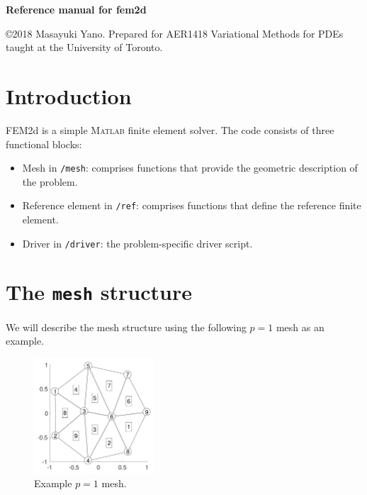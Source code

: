 \documentclass[openany,preprint,11pt]{article}
\newcommand{\disclaimer}{\copyright2018 Masayuki Yano.  Prepared for AER1418 Variational Methods for PDEs taught at the University of Toronto.}
\begin{document}
\begin{center}
  \begin{LARGE}
    \textbf{Reference manual for fem2d}
  \end{LARGE}
\end{center}

\noindent\disclaimer
\section{Introduction}
FEM2d is a simple \textsc{Matlab} finite element solver.  The code consists of three functional blocks:
\begin{itemize}
\item Mesh in \texttt{/mesh}: comprises functions that provide the geometric description of the problem. 
\item Reference element in \texttt{/ref}: comprises functions that define the reference finite element.
\item Driver in \texttt{/driver}: the problem-specific driver script.
\end{itemize}
\section{The \texttt{mesh} structure}
We will describe the mesh structure using the following $p=1$ mesh as an example.
\begin{figure}[!h]
  \centering
  \includegraphics[width=0.4\textwidth]{mesh_p1}
  \caption{Example $p=1$ mesh.}
\end{figure}
\end{document}

